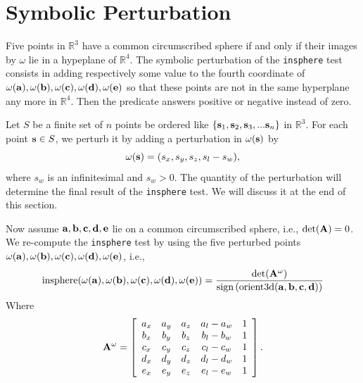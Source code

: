 \section{Symbolic Perturbation}

Five points in $\mathbb{R}^3$ have a common circumscribed sphere if and only if their images by $\omega$ lie in a hypeplane of $\mathbb{R}^4$. The symbolic perturbation of the {\tt insphere} test consists in adding respectively some value to the fourth coordinate of $\omega({\bf a}), \omega({\bf b}), \omega({\bf c}), \omega({\bf d}), \omega({\bf e})$ so that these points are not in the same hyperplane any more in $\mathbb{R}^4$. Then the predicate answers positive or negative instead of zero.

Let $S$ be a finite set of $n$ points be ordered like $\{{\bf s}_1, {\bf s}_2, {\bf s}_3, ... {\bf s}_{n}\}$ in $\mathbb{R}^3$. For each point ${\bf s} \in S$, we perturb it by adding a perturbation in $\omega({\bf s})$ by
\begin{equation}
\omega({\bf s}) = (s_{x}, s_{y}, s_{z}, s_{l}-s_{w}),
\end{equation}
where $s_w$ is an infinitesimal and $s_w > 0$. The quantity of the perturbation will determine the final result of the {\tt insphere} test. We will discuss it at the end of this section.

Now assume ${\bf a}, {\bf b}, {\bf c}, {\bf d}, {\bf e}$ lie on a common circumscribed sphere, i.e., $\textrm{det}({\bf A}) = 0$. We re-compute the {\tt insphere} test by using the five perturbed points $\omega({\bf a}), \omega({\bf b}), \omega({\bf c}), \omega({\bf d}), \omega({\bf e})$, i.e., 
\[
  \textrm{insphere}(\omega({\bf a}), \omega({\bf b}), \omega({\bf c}), \omega({\bf d}), \omega({\bf e})) = \frac{\textrm{det}({\bf A}^{\omega})}{\textrm{sign}\left(\textrm{orient3d}({\bf a}, {\bf b}, {\bf c}, {\bf d})\right)}
\]
Where
\begin{equation}
  {\bf A}^{\omega} = \left[\begin{array}{ccccc}
      a_x & a_y & a_z & a_l - a_w & 1\\
      b_x & b_y & b_z & b_l - b_w & 1\\
      c_x & c_y & c_z & c_l - c_w & 1\\
      d_x & d_y & d_z & d_l - d_w & 1\\
      e_x & e_y & e_z & e_l - e_w & 1 
      \end{array}\right].
\end{equation}


